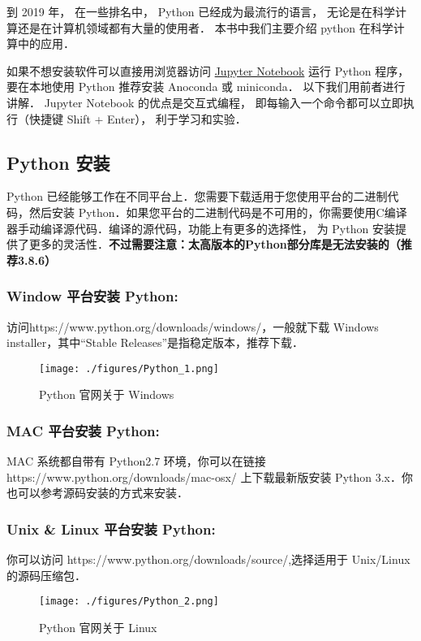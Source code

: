 
\begin{issues}
\issueTODO
\end{issues}

到 2019 年， 在一些排名中， Python 已经成为最流行的语言， 无论是在科学计算还是在计算机领域都有大量的使用者． 本书中我们主要介绍 python 在科学计算中的应用．

如果不想安装软件可以直接用浏览器访问 \href{https://jupyter.org/}{Jupyter Notebook} 运行 Python 程序， 要在本地使用 Python 推荐安装 Anoconda 或 miniconda． 以下我们用前者进行讲解． Jupyter Notebook 的优点是交互式编程， 即每输入一个命令都可以立即执行（快捷键 Shift + Enter）， 利于学习和实验．

\subsection{Python 安装}
Python 已经能够工作在不同平台上．您需要下载适用于您使用平台的二进制代码，然后安装 Python．如果您平台的二进制代码是不可用的，你需要使用C编译器手动编译源代码．编译的源代码，功能上有更多的选择性， 为 Python 安装提供了更多的灵活性．\textbf{不过需要注意：太高版本的Python部分库是无法安装的（推荐3.8.6）}

\subsubsection{Window 平台安装 Python:}
访问https://www.python.org/downloads/windows/，一般就下载  Windows installer，其中“Stable Releases”是指稳定版本，推荐下载．
\begin{figure}[ht]
\centering
\texttt{[image: ./figures/Python\_1.png]}
\caption{Python 官网关于 Windows} \label{Python_fig1}
\end{figure}

\subsubsection{MAC 平台安装 Python:}
MAC 系统都自带有 Python2.7 环境，你可以在链接 https://www.python.org/downloads/mac-osx/ 上下载最新版安装 Python 3.x．你也可以参考源码安装的方式来安装．

\subsubsection{Unix & Linux 平台安装 Python:}
你可以访问 https://www.python.org/downloads/source/,选择适用于 Unix/Linux 的源码压缩包．
\begin{figure}[ht]
\centering
\texttt{[image: ./figures/Python\_2.png]}
\caption{Python 官网关于 Linux} \label{Python_fig2}
\end{figure}

